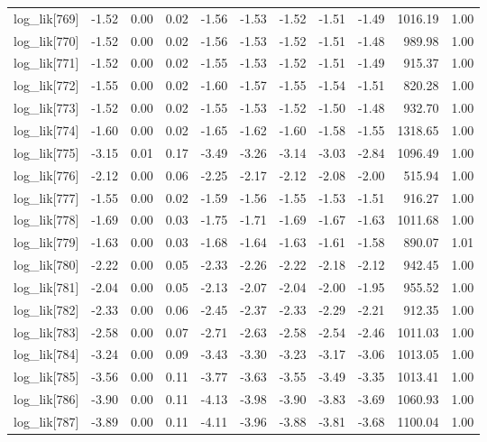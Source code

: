 \begin{table}[ht]
\begin{tabular}{rrrrrrrrrrr}
  log\_lik[769] & -1.52 & 0.00 & 0.02 & -1.56 & -1.53 & -1.52 & -1.51 & -1.49 & 1016.19 & 1.00 \\ 
  log\_lik[770] & -1.52 & 0.00 & 0.02 & -1.56 & -1.53 & -1.52 & -1.51 & -1.48 & 989.98 & 1.00 \\ 
  log\_lik[771] & -1.52 & 0.00 & 0.02 & -1.55 & -1.53 & -1.52 & -1.51 & -1.49 & 915.37 & 1.00 \\ 
  log\_lik[772] & -1.55 & 0.00 & 0.02 & -1.60 & -1.57 & -1.55 & -1.54 & -1.51 & 820.28 & 1.00 \\ 
  log\_lik[773] & -1.52 & 0.00 & 0.02 & -1.55 & -1.53 & -1.52 & -1.50 & -1.48 & 932.70 & 1.00 \\ 
  log\_lik[774] & -1.60 & 0.00 & 0.02 & -1.65 & -1.62 & -1.60 & -1.58 & -1.55 & 1318.65 & 1.00 \\ 
  log\_lik[775] & -3.15 & 0.01 & 0.17 & -3.49 & -3.26 & -3.14 & -3.03 & -2.84 & 1096.49 & 1.00 \\ 
  log\_lik[776] & -2.12 & 0.00 & 0.06 & -2.25 & -2.17 & -2.12 & -2.08 & -2.00 & 515.94 & 1.00 \\ 
  log\_lik[777] & -1.55 & 0.00 & 0.02 & -1.59 & -1.56 & -1.55 & -1.53 & -1.51 & 916.27 & 1.00 \\ 
  log\_lik[778] & -1.69 & 0.00 & 0.03 & -1.75 & -1.71 & -1.69 & -1.67 & -1.63 & 1011.68 & 1.00 \\ 
  log\_lik[779] & -1.63 & 0.00 & 0.03 & -1.68 & -1.64 & -1.63 & -1.61 & -1.58 & 890.07 & 1.01 \\ 
  log\_lik[780] & -2.22 & 0.00 & 0.05 & -2.33 & -2.26 & -2.22 & -2.18 & -2.12 & 942.45 & 1.00 \\ 
  log\_lik[781] & -2.04 & 0.00 & 0.05 & -2.13 & -2.07 & -2.04 & -2.00 & -1.95 & 955.52 & 1.00 \\ 
  log\_lik[782] & -2.33 & 0.00 & 0.06 & -2.45 & -2.37 & -2.33 & -2.29 & -2.21 & 912.35 & 1.00 \\ 
  log\_lik[783] & -2.58 & 0.00 & 0.07 & -2.71 & -2.63 & -2.58 & -2.54 & -2.46 & 1011.03 & 1.00 \\ 
  log\_lik[784] & -3.24 & 0.00 & 0.09 & -3.43 & -3.30 & -3.23 & -3.17 & -3.06 & 1013.05 & 1.00 \\ 
  log\_lik[785] & -3.56 & 0.00 & 0.11 & -3.77 & -3.63 & -3.55 & -3.49 & -3.35 & 1013.41 & 1.00 \\ 
  log\_lik[786] & -3.90 & 0.00 & 0.11 & -4.13 & -3.98 & -3.90 & -3.83 & -3.69 & 1060.93 & 1.00 \\ 
  log\_lik[787] & -3.89 & 0.00 & 0.11 & -4.11 & -3.96 & -3.88 & -3.81 & -3.68 & 1100.04 & 1.00 \\ 

\end{tabular}
\end{table}
